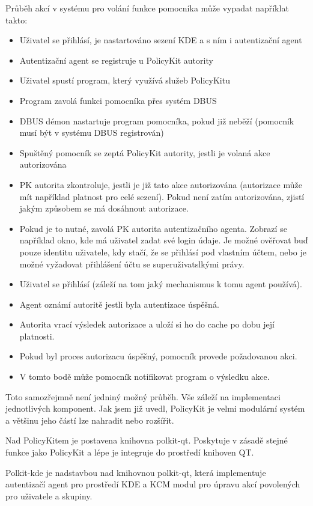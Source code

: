 Průběh akcí v systému pro volání funkce pomocníka může vypadat napříklat takto:
\begin{itemize}
\item Uživatel se přihlásí, je nastartováno sezení KDE a s ním i autentizační
agent
\item Autentizační agent se registruje u PolicyKit autority
\item Uživatel spustí program, který využívá služeb PolicyKitu
\item Program zavolá funkci pomocníka přes systém DBUS
\item DBUS démon nastartuje program pomocníka, pokud již neběží (pomocník musí
být v systému DBUS registrován)
\item Spuštěný pomocník se zeptá PolicyKit autority, jestli je volaná akce
autorizována
\item PK autorita zkontroluje, jestli je již tato akce autorizována (autorizace
může mít například platnost pro celé sezení). Pokud není zatím autorizována,
zjistí jakým způsobem se má dosáhnout autorizace.
\item Pokud je to nutné, zavolá PK autorita autentizačního agenta. Zobrazí se
například okno, kde má uživatel zadat své login údaje. Je možné ověřovat buď
pouze identitu uživatele, kdy stačí, že se přihlásí pod vlastním účtem,
nebo je možné vyžadovat přihlášení účtu se superuživatslkými právy.
\item Uživatel se přihlásí (záleží na tom jaký mechanismus k tomu agent
používá).
\item Agent oznámí autoritě jestli byla autentizace úspěšná.
\item Autorita vrací výsledek autorizace a uloží si ho do cache po dobu její
platnosti.
\item Pokud byl proces autorizacu úspěšný, pomocník provede požadovanou akci.
\item V tomto bodě může pomocník notifikovat program o výsledku akce.
\end{itemize}

Toto samozřejmně není jedniný možný průběh. Vše záleží na implementaci
jednotlivých komponent. Jak jsem již uvedl, PolicyKit je velmi modulární systém
a většinu jeho částí lze nahradit nebo rozšířit.

Nad PolicyKitem je postavena knihovna polkit-qt. Poskytuje v zásadě stejné
funkce jako PolicyKit a lépe je integruje do prostředí knihoven QT. %

Polkit-kde je nadstavbou nad knihovnou polkit-qt, která implementuje autentizačí
agent pro prostředí KDE a KCM modul pro úpravu akcí povolených pro uživatele
a skupiny.

